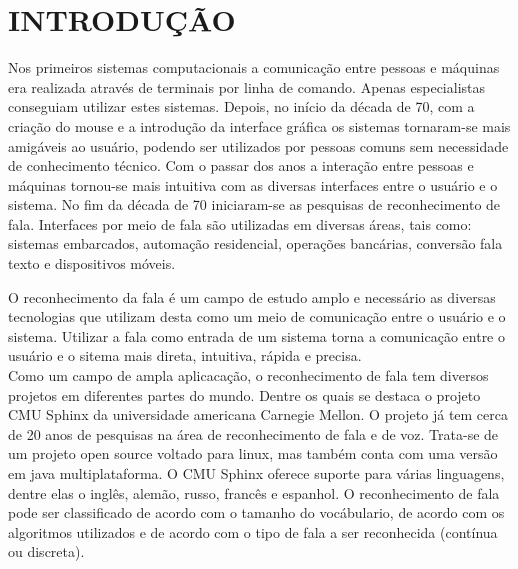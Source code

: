 \chapter{INTRODUÇÃO}
\label{chap:introducao}
 \thispagestyle{plain}


Nos primeiros sistemas computacionais a comunicação entre pessoas e máquinas era realizada através de terminais por linha de comando.  Apenas especialistas conseguiam utilizar estes sistemas.
Depois, no início da década de 70, com a criação do mouse e a introdução da interface gráfica  os sistemas tornaram-se mais amigáveis ao usuário, podendo ser utilizados por pessoas comuns sem necessidade de conhecimento técnico. Com o passar dos anos a interação entre pessoas e máquinas tornou-se mais intuitiva com as diversas interfaces entre o usuário e o sistema. No fim da década de 70 iniciaram-se as pesquisas de reconhecimento de fala.
Interfaces por meio de fala são utilizadas em diversas áreas, tais como: sistemas embarcados, automação residencial, operações bancárias, conversão fala texto e dispositivos móveis.

\quad O reconhecimento da fala é um campo de estudo amplo e necessário as diversas tecnologias que utilizam
desta como um  meio de comunicação entre o usuário e o sistema. Utilizar a fala como entrada de um sistema
torna a comunicação entre o usuário e o sitema mais direta, intuitiva, rápida e precisa.\\ 
Como um campo de ampla aplicacação, o reconhecimento de fala tem diversos projetos em diferentes partes do mundo. Dentre os quais se destaca o projeto CMU Sphinx da universidade americana Carnegie Mellon. O projeto já tem cerca de 20 anos de pesquisas na área de reconhecimento de fala e de voz. Trata-se de um projeto open source voltado para linux, mas também conta com uma versão em java multiplataforma. O CMU Sphinx oferece suporte para várias linguagens, dentre elas o inglês, alemão, russo, francês e espanhol. 
O reconhecimento de fala pode ser classificado de acordo com o tamanho do vocábulario, de acordo com os algoritmos utilizados e de acordo com o tipo de fala a ser reconhecida (contínua ou discreta).




